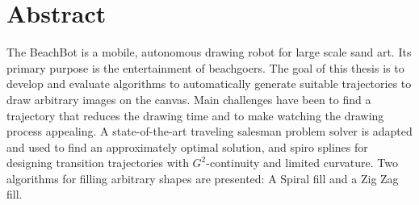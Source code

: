 \chapter*{Abstract}

The BeachBot is a mobile, autonomous drawing robot for large scale sand art. Its primary purpose is the entertainment of beachgoers. The goal of this thesis is to develop and evaluate algorithms to automatically generate suitable trajectories to draw arbitrary images on the canvas. Main challenges have been to find a trajectory that reduces the drawing time and to make watching the drawing process appealing. A state-of-the-art traveling salesman problem solver is adapted and used to find an approximately optimal solution, and spiro splines for designing transition trajectories with $G^2$-continuity and limited curvature. Two algorithms for filling arbitrary shapes are presented: A Spiral fill and a Zig Zag fill.
